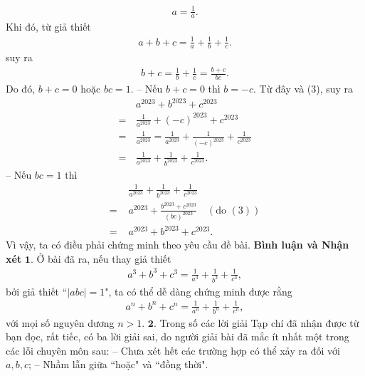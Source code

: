 \begin{multicols}{2}
	\begin{align*}
		a = \frac{1}{a}. \tag{$3$}
	\end{align*}
	Khi đó, từ giả thiết
	\begin{align*}
		a + b + c = \frac{1}{a} + \frac{1}{b} + \frac{1}{c}.
	\end{align*}
	suy ra
	\begin{align*}
		b + c = \frac{1}{b} + \frac{1}{c} = \frac{{b + c}}{{bc}}.
	\end{align*}
	Do đó, $b + c = 0$ hoặc $bc = 1$.
	\vskip 0.05cm
	-- Nếu $b + c = 0$ thì $b = - c$. Từ đây và ($3$), suy ra
	\begin{align*}
		&{a^{2023}} + {b^{2023}} + {c^{2023}}\\
		 = \,&\frac{1}{{{a^{2023}}}} + {\left( { - c} \right)^{2023}} + {c^{2023}}\\
		  = \,&\frac{1}{{{a^{2023}}}} = \frac{1}{{{a^{2023}}}} + \frac{1}{{{{\left( { - c} \right)}^{2023}}}} + \frac{1}{{{c^{2023}}}}\\
		   = \,&\frac{1}{{{a^{2023}}}} + \frac{1}{{{b^{2023}}}} + \frac{1}{{{c^{2023}}}}.
	\end{align*}
	-- Nếu $bc = 1$ thì
	\begin{align*}
			&\frac{1}{{{a^{2023}}}} + \frac{1}{{{b^{2023}}}} + \frac{1}{{{c^{2023}}}} \\
			= \,\,&{a^{2023}} + \frac{{{b^{2023}} + {c^{2023}}}}{{{{\left( {bc} \right)}^{2023}}}} \quad({\text {do }} (3))\\
			 = \,\,&{a^{2023}} + {b^{2023}} + {c^{2023}}.
	\end{align*}
	Vì vậy, ta có điều phải chứng minh theo yêu cầu đề bài.
	\vskip 0.05cm
	\textbf{\color{thachthuctoanhoc}Bình luận và Nhận xét}
	\vskip 0.05cm
	$\pmb{1.}$ Ở bài đã ra, nếu thay giả thiết
	\begin{align*}
		{a^3} + {b^3} + {c^3} = \frac{1}{{{a^3}}} + \frac{1}{{{b^3}}} + \frac{1}{{{c^3}}},
	\end{align*}
	bởi giả thiết ``$|abc| = 1$", ta có thể dễ dàng chứng minh được rằng
	\begin{align*}
		{a^n} + {b^n} + {c^n} = \frac{1}{{{a^n}}} + \frac{1}{{{b^n}}} + \frac{1}{{{c^n}}},
	\end{align*}
	với mọi số nguyên dương $n > 1$.
	\vskip 0.05cm
	$\pmb{2.}$ Trong số các lời giải Tạp chí đã nhận được từ bạn đọc, rất tiếc, có ba lời giải sai, do người giải bài đã mắc ít nhất một trong các lỗi chuyên môn sau:
	\vskip 0.05cm
	-- Chưa xét hết các trường hợp có thể xảy ra đối với $a, b, c$;
	\vskip 0.05cm
	-- Nhầm lẫn giữa ``hoặc" và ``đồng thời".

\end{multicols}
